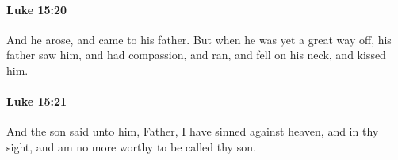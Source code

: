 		\paragraph{Luke 15:20} %
			\label{LUKE-15-20}

			And he arose, and came to his father. But when he was yet a great way off, his father saw him, and had compassion, and ran, and fell on his neck, and kissed him.

			\begin{framed}
			\scriptsize
				\begin{compactdesc}
					\item[SBLG] 
				\end{compactdesc}
			\end{framed}

		\paragraph{Luke 15:21} %
			\label{LUKE-15-21}

			And the son said unto him, Father, I have sinned against heaven, and in thy sight, and am no more worthy to be called thy son.


